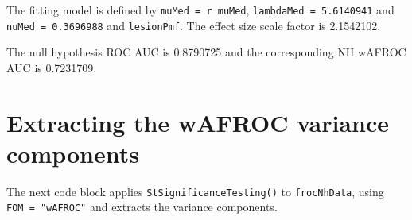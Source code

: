 \documentclass[
]{book}
\newenvironment{Shaded}{\begin{snugshade}}{\end{snugshade}}
\newcommand{\DataTypeTok}[1]{\textcolor[rgb]{0.13,0.29,0.53}{#1}}
\newcommand{\KeywordTok}[1]{\textcolor[rgb]{0.13,0.29,0.53}{\textbf{#1}}}
\newcommand{\NormalTok}[1]{#1}
\newcommand{\OperatorTok}[1]{\textcolor[rgb]{0.81,0.36,0.00}{\textbf{#1}}}
\newcommand{\StringTok}[1]{\textcolor[rgb]{0.31,0.60,0.02}{#1}}
\begin{document}
The fitting model is defined by \texttt{muMed\ =\ r\ muMed}, \texttt{lambdaMed\ =\ 5.6140941} and \texttt{nuMed\ =\ 0.3696988} and \texttt{lesionPmf}. The effect size scale factor is 2.1542102.

\begin{Shaded}
\end{Shaded}

The null hypothesis ROC AUC is 0.8790725 and the corresponding NH wAFROC AUC is 0.7231709.

\hypertarget{extracting-the-wafroc-variance-components}{%
\section{Extracting the wAFROC variance components}\label{extracting-the-wafroc-variance-components}}

The next code block applies \texttt{StSignificanceTesting()} to \texttt{frocNhData}, using \texttt{FOM\ =\ "wAFROC"} and extracts the variance components.

\begin{Shaded}
\end{Shaded}
\end{document}
